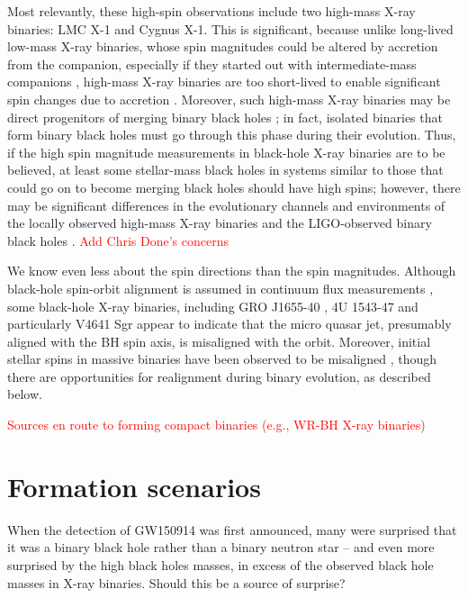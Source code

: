 \documentclass[iop,onecolumn]{revtex4}
\newcommand{\todo}[1]{\textcolor{red}{#1}}
\begin{document}
Most relevantly, these high-spin observations include two high-mass X-ray binaries: LMC X-1 and Cygnus X-1.  This is significant, because unlike long-lived low-mass X-ray binaries, whose spin magnitudes could be altered by accretion from the companion, especially if they started out with intermediate-mass companions \citep{2003MNRAS.341..385P,2015ApJ...800...17F}, high-mass X-ray binaries are too short-lived to enable significant spin changes due to accretion \citep{1999MNRAS.305..654K}.  Moreover, such high-mass X-ray binaries may be direct progenitors of merging binary black holes \citep{Bulik:2008,CygnusX3:2012}; in fact, isolated binaries that form binary black holes must go through this phase during their evolution.  Thus, if the high spin magnitude measurements in black-hole X-ray binaries are to be believed, at least some stellar-mass black holes in systems similar to those that could go on to become merging black holes should have high spins; however, there may be significant differences in the evolutionary channels and environments of the locally observed high-mass X-ray binaries and the LIGO-observed binary black holes \citep{HotokezakaPiran:2017}.  \todo{Add Chris Done's concerns}

We know even less about the spin directions than the spin magnitudes.  Although black-hole spin-orbit alignment is assumed in continuum flux measurements \citep{2015PhR...548....1M}, some black-hole X-ray binaries, including GRO J1655-40 \citep{Martin:2008}, 4U 1543-47 \citep{MorningstarMiller:2014} and particularly V4641 Sgr \citep{Orosz:2001,Martin:2008b} appear to indicate that the micro
quasar jet, presumably aligned with the BH spin axis, is misaligned with the orbit.  Moreover, initial stellar spins in massive binaries have been observed to be misaligned \citep[e.g.,][]{Albrecht:2009,2014ApJ...785...83A}, though there are opportunities for realignment during binary evolution, as described below.




\todo{Sources en route to forming compact binaries (e.g., WR-BH X-ray binaries) }

\section{Formation scenarios}\label{form}

When the detection of GW150914 was first announced, many were surprised that it was a binary black hole rather than a binary neutron star -- and even more surprised by the high black holes masses, in excess of the observed black hole masses in X-ray binaries.  Should this be a source of surprise?
\end{document}
